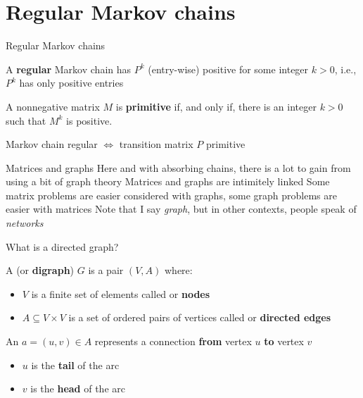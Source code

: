 \documentclass[aspectratio=169]{beamer}\usepackage[]{graphicx}\usepackage[]{xcolor}
\begin{document}
\section{Regular Markov chains}


\begin{frame}{Regular Markov chains}
\begin{definition}
A \textbf{regular} Markov chain has $P^k$ (entry-wise) positive for some integer $k>0$, i.e., $P^k$ has only positive entries
\end{definition}
\vfill
\begin{definition}
A nonnegative matrix $M$ is \textbf{primitive} if, and only if, there is an integer $k>0$ such that $M^k$ is positive.
\end{definition}
\vfill
\begin{theorem}
Markov chain regular $\iff$ transition matrix $P$ primitive
\end{theorem}
\end{frame}

\begin{frame}{Matrices and graphs}
Here and with absorbing chains, there is a lot to gain from using a bit of graph theory
\vfill
Matrices and graphs are intimitely linked 
\vfill
Some matrix problems are easier considered with graphs, some graph problems are easier with matrices
\vfill
Note that I say \emph{graph}, but in other contexts, people speak of \emph{networks}
\end{frame}

\begin{frame}{What is a directed graph?}
\begin{definition}[Digraph]
A  (or \textbf{digraph}) $G$ is a pair $(V, A)$ where:
    \begin{itemize}
        \item $V$ is a finite set of elements called  or \textbf{nodes}
        \item $A \subseteq V \times V$ is a set of ordered pairs of vertices called  or \textbf{directed edges}
    \end{itemize}
\end{definition}
    \vfill
\begin{definition}[Arc]
    An  $a = (u, v) \in A$ represents a connection \textbf{from} vertex $u$ \textbf{to} vertex $v$
    \begin{itemize}
        \item $u$ is the \textbf{tail} of the arc
        \item $v$ is the \textbf{head} of the arc
    \end{itemize}
\end{definition}
\end{frame}
\end{document}
